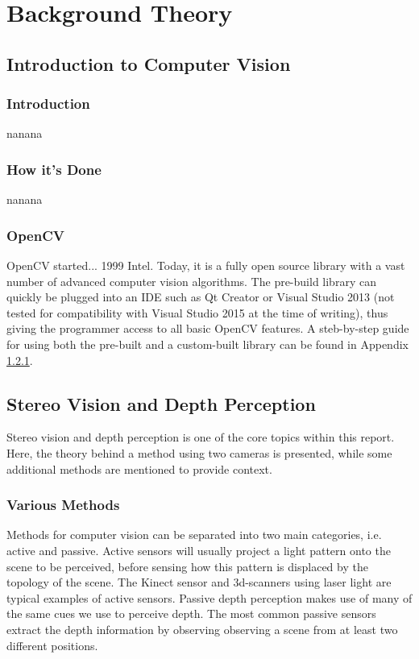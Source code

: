 \chapter{Background Theory}

\section{Introduction to Computer Vision}

\subsection{Introduction}
nanana

\subsection{How it's Done}
nanana

\subsection{OpenCV}

OpenCV started... 1999 Intel. Today, it is a fully open source library with a vast number of advanced computer vision algorithms. The pre-build library can quickly be plugged into  an IDE such as Qt Creator or Visual Studio 2013 (not tested for compatibility with Visual Studio 2015 at the time of writing), thus giving the programmer access to all basic OpenCV features. A steb-by-step guide for using both the pre-built and a custom-built library can be found in Appendix \ref{}.

\section{Stereo Vision and Depth Perception}

Stereo vision and depth perception is one of the core topics within this report. Here, the theory behind a method using two cameras is presented, while some additional methods are mentioned to provide context.

\subsection{Various Methods}

Methods for computer vision can be separated into two main categories, i.e. active and passive. Active sensors will usually project a light pattern onto the scene to be perceived, before sensing how this pattern is displaced by the topology of the scene. The Kinect sensor and 3d-scanners using laser light are typical examples of active sensors. Passive depth perception makes use of many of the same cues we use to perceive depth. The most common passive sensors extract the depth information by observing observing a scene from at least two different positions. 


